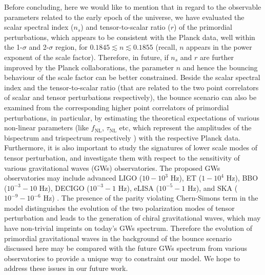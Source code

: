 \documentclass{article}
\begin{document}
Before concluding, here we would like to mention that in regard to the observable parameters related to the early epoch of the universe, 
we have evaluated the scalar spectral index ($n_s$) and tensor-to-scalar ratio ($r$) of the 
primordial perturbations, which appears to be consistent with the Planck data, well within the 1-$\sigma$ and 2-$\sigma$ region, 
for $0.1845 \lesssim n \lesssim 0.1855$ 
(recall, $n$ appears in the power exponent of the scale factor). Therefore, in future, if $n_s$ and $r$ are further improved by the Planck collaborations, 
the parameter $n$ and hence the bouncing behaviour of the scale factor can be better constrained. 
Beside the scalar spectral index and the tensor-to-scalar ratio (that are 
related to the two point correlators of scalar and tensor perturbations respectively), the bounce 
scenario can also be examined from the corresponding higher point correlators of primordial perturbations, in particular, by 
estimating the theoretical expectations of various non-linear parameters 
(like $f_\mathrm{NL}$, $\tau_\mathrm{NL}$ etc, which represent the amplitudes of the bispectrum 
and trispectrum respectively \cite{Akrami:2018odb,Cai:2009fn,Agullo:2020cvg}) with the respective Planck data. Furthermore, it is also important to 
study the signatures of lower scale modes of tensor perturbation, and investigate them with respect to the sensitivity of 
various gravitational waves (GWs) observatories. The proposed GWs observatories may include advanced LIGO ($10-10^3$ Hz), ET ($1-10^4$ Hz), 
BBO ($10^{-3}-10$ Hz), DECIGO ($10^{-3}-1$ Hz), eLISA ($10^{-5}-1$ Hz), and SKA ($10^{-9}-10^{-6}$ Hz) \cite{LIGOScientific:2016jlg,
Janssen:2014dka,Amaro-Seoane:2012aqc}. The presence of the parity violating Chern-Simons term in the model distinguishes the evolution of the two polarization modes 
of tensor perturbation and leads to the generation of chiral gravitational waves, which may have non-trivial imprints on today's GWs spectrum. 
Therefore the evolution of primordial gravitational waves in the background of the bounce scenario discussed here may be compared with the future GWs spectrum from various observatories to provide a unique way to constraint our model. We hope to 
address these issues in our future work.
\end{document}
